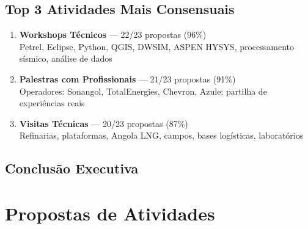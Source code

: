 \documentclass[12pt,a4paper,oneside]{article}
\begin{document}
\vspace{1.5cm}

\subsection*{Top 3 Atividades Mais Consensuais}

\begin{enumerate}[label={\fontsize{16}{18}\selectfont\color{spe-accent}\textbf{\arabic*.}}, font=\bfseries]
  
  \item[\emoji{🥇}] \textbf{Workshops Técnicos} — 22/23 propostas (96\%)\\
    {\normalfont\color{spe-dark}Petrel, Eclipse, Python, QGIS, DWSIM, ASPEN HYSYS, processamento sísmico, análise de dados}
  
  \item[\emoji{🥈}] \textbf{Palestras com Profissionais} — 21/23 propostas (91\%)\\
    {\normalfont\color{spe-dark}Operadores: Sonangol, TotalEnergies, Chevron, Azule; partilha de experiências reais}
  
  \item[\emoji{🥉}] \textbf{Visitas Técnicas} — 20/23 propostas (87\%)\\
    {\normalfont\color{spe-dark}Refinarias, plataformas, Angola LNG, campos, bases logísticas, laboratórios}

\end{enumerate}

\vspace{1.5cm}

\subsection*{Conclusão Executiva}

\noindent{}

\newpage

\section{Propostas de Atividades}
\end{document}

